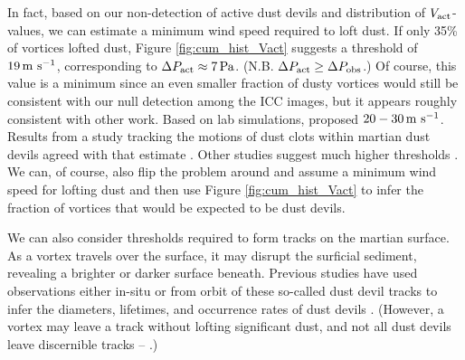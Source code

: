 \documentclass[linenumbers,trackchanges]{aastex63}
\begin{document}


In fact, based on our non-detection of active dust devils and distribution of $V_{\rm act}$-values, we can estimate a minimum wind speed required to loft dust. If only 35\% of vortices lofted dust, Figure \ref{fig:cum_hist_Vact} suggests a threshold of $19\,{\rm m\ s^{-1}}$, corresponding to $\Delta P_{\rm act} \approx 7\,{\rm Pa}$. (N.B. $\Delta P_{\rm act} \geq \Delta P_{\rm obs}$.) Of course, this value is a minimum since an even smaller fraction of dusty vortices would still be consistent with our null detection among the ICC images, but it appears roughly consistent with other work. Based on lab simulations, \citet{2003JGRE..108.5041G} proposed $20-30\,{\rm m\ s^{-1}}$. Results from a study tracking the motions of dust clots within martian dust devils agreed with that estimate \citep{2011GeoRL..3824206C}. Other studies suggest much higher thresholds \citep[\emph{cf.}][]{2006JGRE..11112002C}. We can, of course, also flip the problem around and assume a minimum wind speed for lofting dust and then use Figure \ref{fig:cum_hist_Vact} to infer the fraction of vortices that would be expected to be dust devils.

We can also consider thresholds required to form tracks on the martian surface. As a vortex travels over the surface, it may disrupt the surficial sediment, revealing a brighter or darker surface beneath. Previous studies have used observations either in-situ or from orbit of these so-called dust devil tracks to infer the diameters, lifetimes, and occurrence rates of dust devils \citep[\emph{e.g.},][]{2008JGRE..113.7002W}. (However, a vortex may leave a track without lofting significant dust, and not all dust devils leave discernible tracks -- \citealp{2005JGRE..110.6002G}.) 
\end{document}
